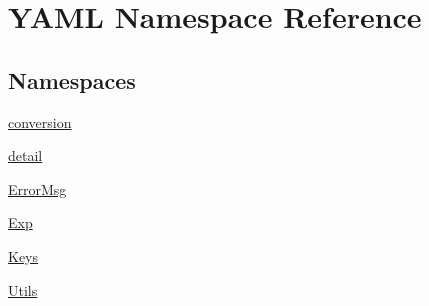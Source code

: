 \hypertarget{namespace_y_a_m_l}{}\section{Y\+A\+ML Namespace Reference}
\label{namespace_y_a_m_l}
\subsection*{Namespaces}
\begin{DoxyCompactItemize}
\item 
 \mbox{\hyperlink{namespace_y_a_m_l_1_1conversion}{conversion}}
\item 
 \mbox{\hyperlink{namespace_y_a_m_l_1_1detail}{detail}}
\item 
 \mbox{\hyperlink{namespace_y_a_m_l_1_1_error_msg}{Error\+Msg}}
\item 
 \mbox{\hyperlink{namespace_y_a_m_l_1_1_exp}{Exp}}
\item 
 \mbox{\hyperlink{namespace_y_a_m_l_1_1_keys}{Keys}}
\item 
 \mbox{\hyperlink{namespace_y_a_m_l_1_1_utils}{Utils}}
\end{DoxyCompactItemize}
